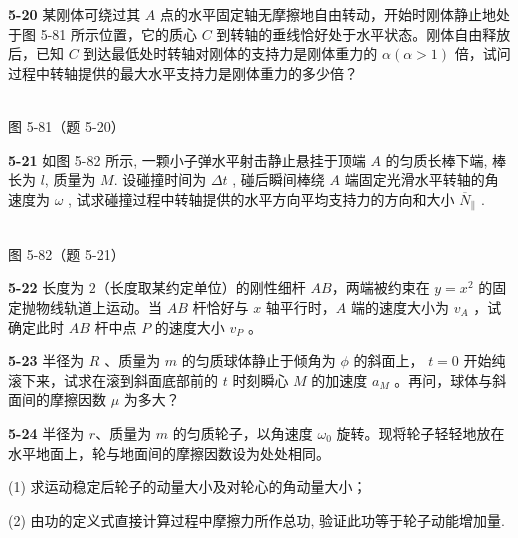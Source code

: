\newpage

\textbf{5-20} 某刚体可绕过其 $A$ 点的水平固定轴无摩擦地自由转动，开始时刚体静止地处于图 5-81 所示位置，它的质心 $C$ 到转轴的垂线恰好处于水平状态。刚体自由释放后，已知 $C$ 到达最低处时转轴对刚体的支持力是刚体重力的 $\alpha (\alpha > 1)$ 倍，试问过程中转轴提供的最大水平支持力是刚体重力的多少倍？

\begin{center}
\resizebox{0.50\textwidth}{!}{}\\[4pt]
{\small 图 5-81（题 5-20）}
\end{center}

\newpage

\textbf{5-21} 如图 5-82 所示, 一颗小子弹水平射击静止悬挂于顶端 $A$ 的匀质长棒下端, 棒长为 $l$, 质量为 $M$. 设碰撞时间为 $\Delta t$ , 碰后瞬间棒绕 $A$ 端固定光滑水平转轴的角速度为 $\omega$ , 试求碰撞过程中转轴提供的水平方向平均支持力的方向和大小 $\overline{N}_{\parallel}$ .

\begin{center}
\resizebox{0.29\textwidth}{!}{}\\[4pt]
{\small 图 5-82（题 5-21）}
\end{center}

\newpage

\textbf{5-22} 长度为 $2$（长度取某约定单位）的刚性细杆 $AB$，两端被约束在 $y=x^{2}$ 的固定抛物线轨道上运动。当 $AB$ 杆恰好与 $x$ 轴平行时，$A$ 端的速度大小为 $v_{A}$ ，试确定此时 $AB$ 杆中点 $P$ 的速度大小 $v_{P}$ 。

\newpage

\textbf{5-23} 半径为 $R$ 、质量为 $m$ 的匀质球体静止于倾角为 $\phi$ 的斜面上， $t = 0$ 开始纯滚下来，试求在滚到斜面底部前的 $t$ 时刻瞬心 $M$ 的加速度 $a_{M}$ 。再问，球体与斜面间的摩擦因数 $\mu$ 为多大？

\newpage

\textbf{5-24} 半径为 $r$、质量为 $m$ 的匀质轮子，以角速度 $\omega_{0}$ 旋转。现将轮子轻轻地放在水平地面上，轮与地面间的摩擦因数设为处处相同。

(1) 求运动稳定后轮子的动量大小及对轮心的角动量大小；

(2) 由功的定义式直接计算过程中摩擦力所作总功, 验证此功等于轮子动能增加量.

\newpage

